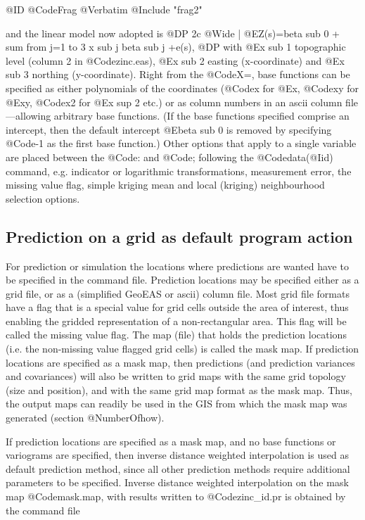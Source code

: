 \documentclass{article}
\begin{document}
@ID @CodeFrag { @Verbatim { @Include { "frag2" }}}

and the linear model now adopted is
@DP
2c @Wide{} | @E{Z(s)=beta sub 0 + sum from j=1 to 3 x sub j beta sub
j +e(s),}
@DP
with @E{x sub 1} topographic level (column 2 in @Code{zinc.eas}), @E{x
sub 2} easting (x-coordinate) and @E{x sub 3} northing (y-coordinate).
Right from the @Code{X=}, base functions can be specified as either
polynomials of the coordinates (@Code{x} for @E{x}, @Code{xy} for
@E{xy}, @Code{x2} for @E{x sup 2} etc.) or as column numbers in an ascii
column file---allowing arbitrary base functions.  (If the base functions
specified comprise an intercept, then the default intercept @E{beta sub
0} is removed by specifying @Code{-1} as the first base function.) Other
options that apply to a single variable are placed between the @Code{:}
and @Code{;} following the @Code{data(@I{id})} command, e.g. indicator
or logarithmic transformations, measurement error, the missing value
flag, simple kriging mean and local (kriging) neighbourhood selection
options.

\subsection{Prediction on a grid as default program action}
For prediction or simulation the locations where predictions are wanted
have to be specified in the command file. Prediction locations may be
specified either as a grid file, or as a (simplified GeoEAS or ascii)
column file. Most grid file formats have a flag that is a special value
for grid cells outside the area of interest, thus enabling the gridded
representation of a non-rectangular area. This flag will be called the
missing value flag. The map (file) that holds the prediction locations
(i.e. the non-missing value flagged grid cells) is called the mask map.
If prediction locations are specified as a mask map, then predictions
(and prediction variances and covariances) will also be written to grid
maps with the same grid topology (size and position), and with the same
grid map format as the mask map. Thus, the output maps can readily be
used in the GIS from which the mask map was generated (section
@NumberOf{how}).

If prediction locations are specified as a mask map, and no base
functions or variograms are specified, then inverse distance weighted
interpolation is used as default prediction method, since all other
prediction methods require additional parameters to be specified.
Inverse distance weighted interpolation on the mask map @Code{mask.map},
with results written to @Code{zinc_id.pr} is obtained by the command
file
\end{document}
